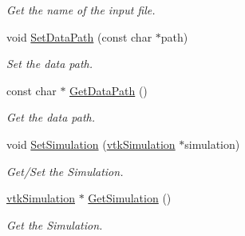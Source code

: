 \begin{DoxyCompactItemize}
\begin{DoxyCompactList}\small\item\em Get the name of the input file. \item\end{DoxyCompactList}\item 
\hypertarget{classvtkSRMLImporter_a15e7305b3b61c1b8c911d4d0732c126e}{
void \hyperlink{classvtkSRMLImporter_a15e7305b3b61c1b8c911d4d0732c126e}{SetDataPath} (const char $\ast$path)}
\label{classvtkSRMLImporter_a15e7305b3b61c1b8c911d4d0732c126e}

\begin{DoxyCompactList}\small\item\em Set the data path. \item\end{DoxyCompactList}\item 
\hypertarget{classvtkSRMLImporter_a46e36fafdd171ef650f8e837ed2e9c2f}{
const char $\ast$ \hyperlink{classvtkSRMLImporter_a46e36fafdd171ef650f8e837ed2e9c2f}{GetDataPath} ()}
\label{classvtkSRMLImporter_a46e36fafdd171ef650f8e837ed2e9c2f}

\begin{DoxyCompactList}\small\item\em Get the data path. \item\end{DoxyCompactList}\item 
\hypertarget{classvtkSRMLImporter_af48e96fae89287bed52774aa94155f1b}{
void \hyperlink{classvtkSRMLImporter_af48e96fae89287bed52774aa94155f1b}{SetSimulation} (\hyperlink{classvtkSimulation}{vtkSimulation} $\ast$simulation)}
\label{classvtkSRMLImporter_af48e96fae89287bed52774aa94155f1b}

\begin{DoxyCompactList}\small\item\em Get/Set the Simulation. \item\end{DoxyCompactList}\item 
\hypertarget{classvtkSRMLImporter_a98df8b0a01a661642e2a83d77fbf293c}{
\hyperlink{classvtkSimulation}{vtkSimulation} $\ast$ \hyperlink{classvtkSRMLImporter_a98df8b0a01a661642e2a83d77fbf293c}{GetSimulation} ()}
\label{classvtkSRMLImporter_a98df8b0a01a661642e2a83d77fbf293c}

\begin{DoxyCompactList}\small\item\em Get the Simulation. \item\end{DoxyCompactList}\end{DoxyCompactItemize}
